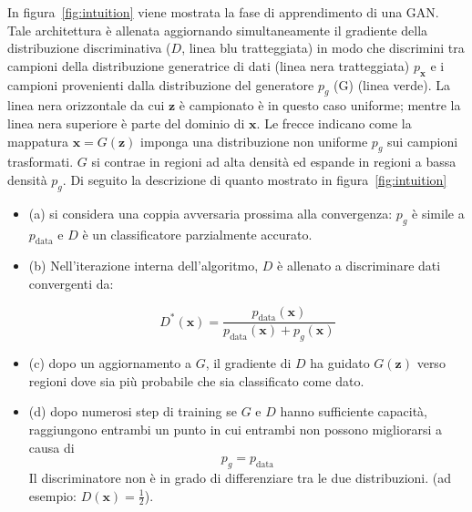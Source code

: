 In figura~\ref{fig:intuition} viene mostrata la fase di apprendimento di una GAN. Tale architettura è allenata aggiornando simultaneamente il gradiente della distribuzione discriminativa ($D$, linea blu tratteggiata) in modo che discrimini tra campioni della distribuzione generatrice di dati (linea nera tratteggiata) $p_{\bm{x}}$ e i campioni provenienti dalla distribuzione del generatore $p_g$ (G) (linea verde).
La linea nera orizzontale da cui $\bm{z}$ è campionato è in questo caso uniforme; mentre la linea nera superiore è parte del dominio di $\bm{x}$. Le frecce indicano come la mappatura $\bm{x}=G(\bm{z})$ imponga una distribuzione non uniforme $p_g$ sui campioni trasformati. $G$ si contrae in regioni ad alta densità ed espande in regioni a bassa densità $p_g$. 
Di seguito la descrizione di quanto mostrato in figura~\ref{fig:intuition}
\begin{itemize}
\item (a) si considera una coppia avversaria prossima alla convergenza: $p_g$ è simile a $p_\text{data}$ e
$D$ è un classificatore parzialmente accurato.

\item (b) Nell'iterazione interna dell'algoritmo, $D$ è allenato a discriminare dati convergenti da:

\[D^*(\bm{x}) = 
\frac{
    p_\text{data}(\bm{x})
    }{
        p_\text{data}(\bm{x}) + p_g(\bm{x})}
\]

\item (c) dopo un aggiornamento a $G$, il gradiente di $D$ ha guidato $G(\bm{z})$ verso regioni dove sia più probabile che sia classificato come dato.

\item (d) dopo numerosi step di training se $G$ e $D$ hanno sufficiente capacità, raggiungono entrambi un punto in cui entrambi non possono migliorarsi a causa di \[p_g = p_\text{data}\] Il discriminatore non è in grado di differenziare tra le due distribuzioni. (ad esempio: $D(\bm{x}) = \frac{1}{2}$).
\end{itemize}

